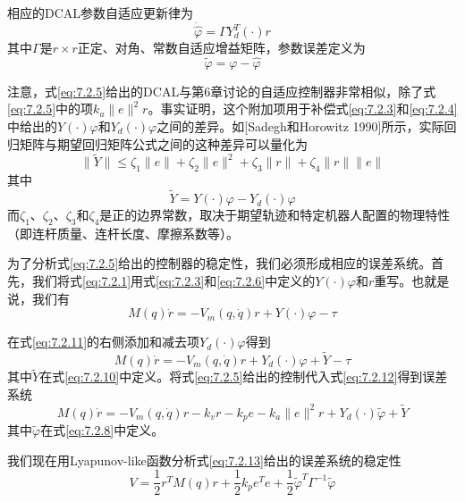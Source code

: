 \documentclass[UTF8]{ctexart}
\begin{document}
相应的DCAL参数自适应更新律为
\begin{equation}\label{eq:7.2.7}
\dot{\hat{\varphi}} = \Gamma Y_d^T(\cdot) r
\end{equation}
其中$\Gamma$是$r \times r$正定、对角、常数自适应增益矩阵，参数误差定义为
\begin{equation}\label{eq:7.2.8}
\tilde{\varphi} = \varphi - \hat{\varphi}
\end{equation}

注意，式\eqref{eq:7.2.5}给出的DCAL与第6章讨论的自适应控制器非常相似，除了式\eqref{eq:7.2.5}中的项$k_a\|e\|^2r$。事实证明，这个附加项用于补偿式\eqref{eq:7.2.3}和\eqref{eq:7.2.4}中给出的$Y(\cdot)\varphi$和$Y_d(\cdot)\varphi$之间的差异。如[Sadegh和Horowitz 1990]所示，实际回归矩阵与期望回归矩阵公式之间的这种差异可以量化为
\begin{equation}\label{eq:7.2.9}
\|\tilde{Y}\| \leq \zeta_1\|e\| + \zeta_2\|e\|^2 + \zeta_3\|r\| + \zeta_4\|r\|\|e\|
\end{equation}
其中
\begin{equation}\label{eq:7.2.10}
\tilde{Y} = Y(\cdot)\varphi - Y_d(\cdot)\varphi
\end{equation}
而$\zeta_1$、$\zeta_2$、$\zeta_3$和$\zeta_4$是正的边界常数，取决于期望轨迹和特定机器人配置的物理特性（即连杆质量、连杆长度、摩擦系数等）。

为了分析式\eqref{eq:7.2.5}给出的控制器的稳定性，我们必须形成相应的误差系统。首先，我们将式\eqref{eq:7.2.1}用式\eqref{eq:7.2.3}和\eqref{eq:7.2.6}中定义的$Y(\cdot)\varphi$和$r$重写。也就是说，我们有
\begin{equation}\label{eq:7.2.11}
M(q)\dot{r} = -V_m(q,\dot{q})r + Y(\cdot)\varphi - \tau
\end{equation}

在式\eqref{eq:7.2.11}的右侧添加和减去项$Y_d(\cdot)\varphi$得到
\begin{equation}\label{eq:7.2.12}
M(q)\dot{r} = -V_m(q,\dot{q})r + Y_d(\cdot)\varphi + \tilde{Y} - \tau
\end{equation}
其中$\tilde{Y}$在式\eqref{eq:7.2.10}中定义。将式\eqref{eq:7.2.5}给出的控制代入式\eqref{eq:7.2.12}得到误差系统
\begin{equation}\label{eq:7.2.13}
M(q)\dot{r} = -V_m(q,\dot{q})r - k_v r - k_p e - k_a\|e\|^2r + Y_d(\cdot)\tilde{\varphi} + \tilde{Y}
\end{equation}
其中$\tilde{\varphi}$在式\eqref{eq:7.2.8}中定义。

我们现在用Lyapunov-like函数分析式\eqref{eq:7.2.13}给出的误差系统的稳定性
\begin{equation}\label{eq:7.2.14}
V = \frac{1}{2}r^T M(q) r + \frac{1}{2}k_p e^T e + \frac{1}{2}\tilde{\varphi}^T \Gamma^{-1} \tilde{\varphi}
\end{equation}
\end{document}
